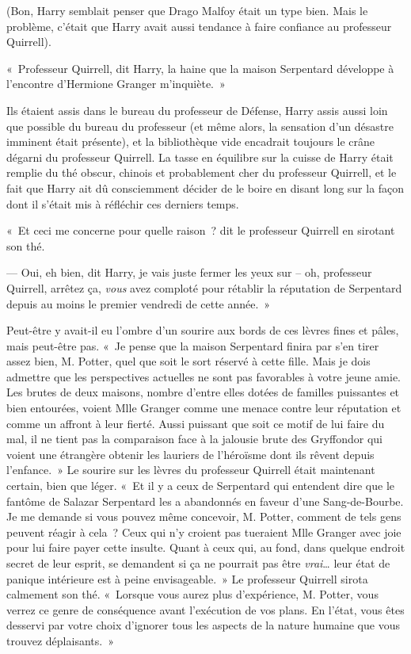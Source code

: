 (Bon, Harry semblait penser que Drago Malfoy était un type bien. Mais le problème, c'était que Harry avait aussi tendance à faire confiance au professeur Quirrell).

\later

«~Professeur Quirrell, dit Harry, la haine que la maison Serpentard développe à l'encontre d'Hermione Granger m'inquiète.~»

Ils étaient assis dans le bureau du professeur de Défense, Harry assis aussi loin que possible du bureau du professeur (et même alors, la sensation d'un désastre imminent était présente), et la bibliothèque vide encadrait toujours le crâne dégarni du professeur Quirrell. La tasse en équilibre sur la cuisse de Harry était remplie du thé obscur, chinois et probablement cher du professeur Quirrell, et le fait que Harry ait dû consciemment décider de le boire en disant long sur la façon dont il s'était mis à réfléchir ces derniers temps.

«~Et ceci me concerne pour quelle raison~? dit le professeur Quirrell en sirotant son thé.

--- Oui, eh bien, dit Harry, je vais juste fermer les yeux sur -- oh, professeur Quirrell, arrêtez ça, \emph{vous} avez comploté pour rétablir la réputation de Serpentard depuis au moins le premier vendredi de cette année.~»

Peut-être y avait-il eu l'ombre d'un sourire aux bords de ces lèvres fines et pâles, mais peut-être pas. «~Je pense que la maison Serpentard finira par s'en tirer assez bien, M. Potter, quel que soit le sort réservé à cette fille. Mais je dois admettre que les perspectives actuelles ne sont pas favorables à votre jeune amie. Les brutes de deux maisons, nombre d'entre elles dotées de familles puissantes et bien entourées, voient Mlle Granger comme une menace contre leur réputation et comme un affront à leur fierté. Aussi puissant que soit ce motif de lui faire du mal, il ne tient pas la comparaison face à la jalousie brute des Gryffondor qui voient une étrangère obtenir les lauriers de l'héroïsme dont ils rêvent depuis l'enfance.~» Le sourire sur les lèvres du professeur Quirrell était maintenant certain, bien que léger. «~Et il y a ceux de Serpentard qui entendent dire que le fantôme de Salazar Serpentard les a abandonnés en faveur d'une Sang-de-Bourbe. Je me demande si vous pouvez même concevoir, M. Potter, comment de tels gens peuvent réagir à cela~? Ceux qui n'y croient pas tueraient Mlle Granger avec joie pour lui faire payer cette insulte. Quant à ceux qui, au fond, dans quelque endroit secret de leur esprit, se demandent si ça ne pourrait pas être \emph{vrai}… leur état de panique intérieure est à peine envisageable.~» Le professeur Quirrell sirota calmement son thé. «~Lorsque vous aurez plus d'expérience, M. Potter, vous verrez ce genre de conséquence avant l'exécution de vos plans. En l'état, vous êtes desservi par votre choix d'ignorer tous les aspects de la nature humaine que vous trouvez déplaisants.~»

